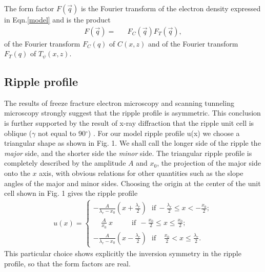 The form factor $F(\vec{q})$ is the Fourier transform of the electron density
expressed in Eqn.\ref{model} and is the product
\begin{eqnarray}
\label{formall}
F(\vec{q}) =&& F_C(\vec{q}) F_T(\vec{q}),
\end{eqnarray}
of the Fourier transform $F_{C}(q)$ of $C(x,z)$ and of the Fourier transform
$F_{T}(q)$ of $T_{\psi}(x,z)$.

\subsection{Ripple profile}

The results of freeze fracture electron microscopy \cite{Luna77,Cop80,Rup83} and
scanning tunneling microscopy \cite{Zas88a,Hata93} strongly suggest that the
ripple profile is asymmetric.  This conclusion is further supported by 
the result
of x-ray diffraction that the ripple unit cell is oblique
($\gamma$ not equal to 90$^{\circ}$) 
\cite{Tar73,JanSS79,Ino80,Ale85,Sir88,Wac89a,Kat95}.
For our model ripple profile
u(x) we choose a triangular shape as shown in
Fig. 1.  We shall call the longer side of the ripple
the {\it major} side, and the shorter side the {\it minor} side.
The triangular ripple profile is completely described by the amplitude
$A$ and $x_0$, the projection of the major side onto the $x$ axis,
with obvious relations for other quantities such as the slope angles
of the major and minor sides.  Choosing the origin at the center
of the unit cell shown in Fig. 1 gives the ripple profile
\begin{eqnarray}
\label{profile}
u(x) = \left\{ \begin{array}{ll}
		-\frac{A}{\lambda_r - x_0} (x + \frac{\lambda_r}{2})
\ \ \ \mbox{if}\ - \frac{\lambda_r}{2} \le x < - \frac{x_0}{2};\\
		\ \ \ \ \ \frac{A}{x_0}\ x\ \ \ \ \ \ \ \ \ \ \ \ \mbox{if}
\ \ - \frac{x_0}{2} \le x \le 
\frac{x_0}{2};\\
		-\frac{A}{\lambda_r - x_0} (x - \frac{\lambda_r}{2})
\ \ \ \mbox{if}\ \ \ \ \  \frac{x_0}{2} < x \le \frac{\lambda_r}{2}.
		\end{array}
	\right.
\end{eqnarray}
This particular choice shows explicitly the inversion
symmetry in the ripple profile, so that the form factors are real.

